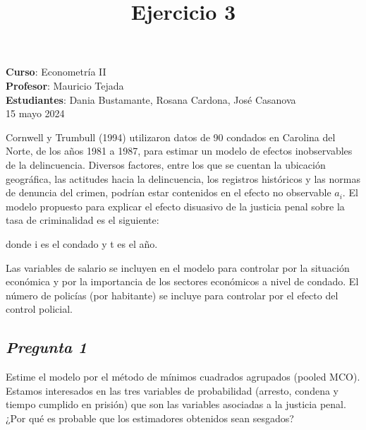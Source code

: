 \documentclass[
  12pt,
]{article}
\title{\textbf{Ejercicio 3}}
\author{}
\date{\vspace{-2.5em}}
\begin{document}
\maketitle

\maketitle
\vspace{-5em}
\vspace{0.5em}

\begin{center}
\footnotesize \textbf{Curso}: Econometría II \\
\footnotesize \textbf{Profesor}: Mauricio Tejada \\
\footnotesize \textbf{Estudiantes}: Dania Bustamante, Rosana Cardona, José Casanova \\
\footnotesize 15 mayo 2024 \\
\end{center}

Cornwell y Trumbull (1994) utilizaron datos de 90 condados en Carolina
del Norte, de los años 1981 a 1987, para estimar un modelo de efectos
inobservables de la delincuencia. Diversos factores, entre los que se
cuentan la ubicación geográfica, las actitudes hacia la delincuencia,
los registros históricos y las normas de denuncia del crimen, podrían
estar contenidos en el efecto no observable \(a_i\). El modelo propuesto
para explicar el efecto disuasivo de la justicia penal sobre la tasa de
criminalidad es el siguiente:

donde i es el condado y t es el año.

Las variables de salario se incluyen en el modelo para controlar por la
situación económica y por la importancia de los sectores económicos a
nivel de condado. El número de policías (por habitante) se incluye para
controlar por el efecto del control policial.

\subsection{\texorpdfstring{\textbf{\emph{Pregunta
1}}}{Pregunta 1}}\label{pregunta-1}

Estime el modelo por el método de mínimos cuadrados agrupados (pooled
MCO). Estamos interesados en las tres variables de probabilidad
(arresto, condena y tiempo cumplido en prisión) que son las variables
asociadas a la justicia penal. ¿Por qué es probable que los estimadores
obtenidos sean sesgados?
\end{document}

